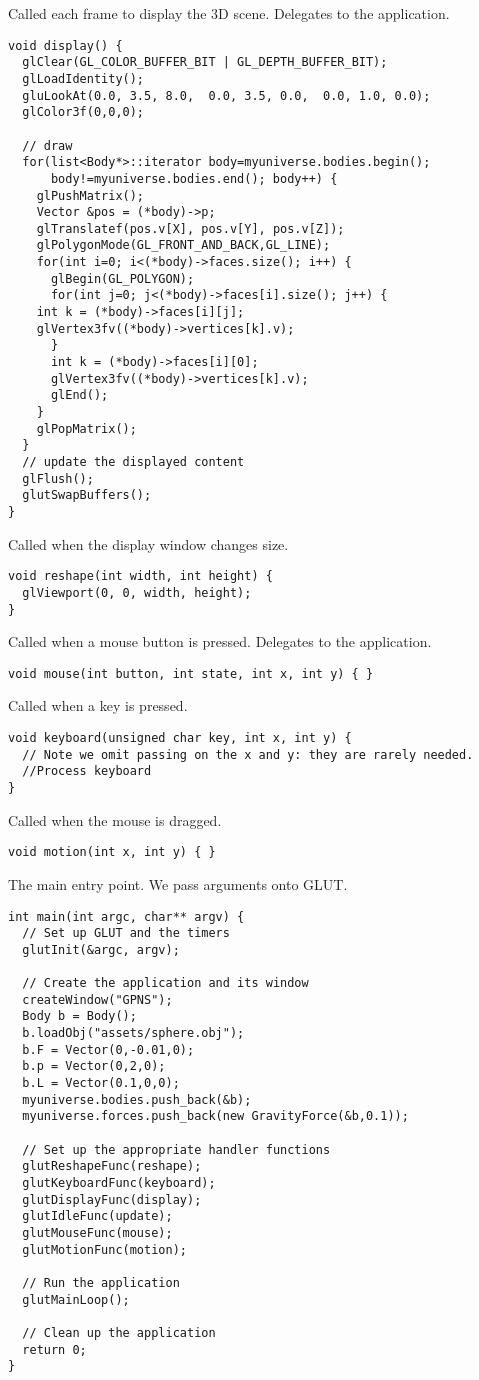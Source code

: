 Called each frame to display the 3D scene. Delegates to
the application.
\begin{lstlisting}
void display() {
  glClear(GL_COLOR_BUFFER_BIT | GL_DEPTH_BUFFER_BIT);
  glLoadIdentity();
  gluLookAt(0.0, 3.5, 8.0,  0.0, 3.5, 0.0,  0.0, 1.0, 0.0);
  glColor3f(0,0,0);
  
  // draw
  for(list<Body*>::iterator body=myuniverse.bodies.begin();
      body!=myuniverse.bodies.end(); body++) {
    glPushMatrix();
    Vector &pos = (*body)->p;
    glTranslatef(pos.v[X], pos.v[Y], pos.v[Z]);
    glPolygonMode(GL_FRONT_AND_BACK,GL_LINE);
    for(int i=0; i<(*body)->faces.size(); i++) {      
      glBegin(GL_POLYGON);
      for(int j=0; j<(*body)->faces[i].size(); j++) {
	int k = (*body)->faces[i][j]; 
	glVertex3fv((*body)->vertices[k].v);
      }
      int k = (*body)->faces[i][0]; 
      glVertex3fv((*body)->vertices[k].v);
      glEnd();
    }
    glPopMatrix();
  }
  // update the displayed content
  glFlush();
  glutSwapBuffers();
}
\end{lstlisting}

Called when the display window changes size.
\begin{lstlisting}
void reshape(int width, int height) {
  glViewport(0, 0, width, height);
}
\end{lstlisting}

Called when a mouse button is pressed. Delegates to the
application.
\begin{lstlisting}
void mouse(int button, int state, int x, int y) { }
\end{lstlisting}

Called when a key is pressed.
\begin{lstlisting}
void keyboard(unsigned char key, int x, int y) {
  // Note we omit passing on the x and y: they are rarely needed.
  //Process keyboard
}
\end{lstlisting}

Called when the mouse is dragged.
\begin{lstlisting}
void motion(int x, int y) { }
\end{lstlisting}

The main entry point. We pass arguments onto GLUT.
\begin{lstlisting}
int main(int argc, char** argv) {
  // Set up GLUT and the timers
  glutInit(&argc, argv);
  
  // Create the application and its window
  createWindow("GPNS");
  Body b = Body();
  b.loadObj("assets/sphere.obj");
  b.F = Vector(0,-0.01,0);
  b.p = Vector(0,2,0);
  b.L = Vector(0.1,0,0);
  myuniverse.bodies.push_back(&b);
  myuniverse.forces.push_back(new GravityForce(&b,0.1));

  // Set up the appropriate handler functions
  glutReshapeFunc(reshape);
  glutKeyboardFunc(keyboard);
  glutDisplayFunc(display);
  glutIdleFunc(update);
  glutMouseFunc(mouse);
  glutMotionFunc(motion);
  
  // Run the application
  glutMainLoop();
  
  // Clean up the application
  return 0;
}
\end{lstlisting}
